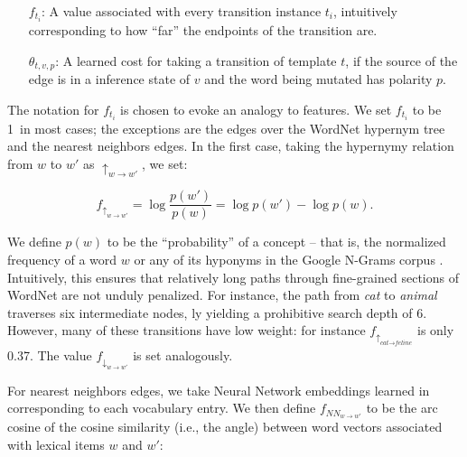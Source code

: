 \vspace{-0.25em}
\begin{itemize}
  \setlength{\itemsep}{-0.25em}
  \indentitem\item[$f_{t_i}$:]
    A value associated with every transition instance $t_i$, intuitively
      corresponding to how ``far'' the endpoints of the transition are.
  \indentitem\item[$\theta_{t,v,p}$:]
    A learned cost for taking a transition of template $t$, if the source
    of the edge is in a inference state of $v$ and the word being mutated
    has polarity $p$.
\end{itemize}
\vspace{-0.25em}

The notation for $f_{t_i}$ is chosen to evoke an analogy to features.
We set $f_{t_i}$ to be 1\ in most cases;
  the exceptions are the edges over the WordNet hypernym tree
  and the nearest neighbors edges.
In the first case, taking the hypernymy relation
  from $w$ to $w'$ as $\uparrow_{w \rightarrow w'}$, we set:

\vspace{-0.5em}
\begin{equation*}
  f_{\uparrow_{w \rightarrow w'}}   = \log \frac{p(w')}{p(w)} = \log p(w') - \log p(w).
\end{equation*}
\vspace{-0.5em}

We define $p(w)$ to be the ``probability'' of a concept --
  that is, the normalized frequency
  of a word $w$ or any of its hyponyms in the Google N-Grams corpus
  \cite{key:2006brants-ngrams}.
Intuitively, this ensures that relatively long paths through fine-grained
  sections of WordNet are not unduly penalized.
For instance, the path from \textit{cat} to \textit{animal} traverses
  six intermediate nodes, \naive ly yielding a prohibitive
  search depth of 6.
However, many of these transitions have low weight:
  for instance
  $f_{\uparrow_{\textit{cat} \rightarrow \textit{feline}}}$ is only
  \num{0.37}.
The value $f_{\downarrow_{w \rightarrow w'}}$ is set analogously.

For nearest neighbors edges, we take Neural Network embeddings learned
  in  corresponding to each vocabulary entry.
We then define $f_{NN_{w \rightarrow w'}}$
  to be the arc cosine of the cosine similarity (i.e., the angle)
  between word vectors associated with lexical items $w$ and $w'$:

